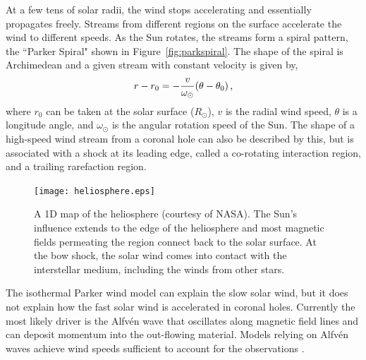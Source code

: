 
At a few tens of solar radii, the wind stops accelerating and essentially propagates freely. Streams from different regions on the surface accelerate the wind to different speeds. As the Sun rotates, the streams form a spiral pattern, the ``Parker Spiral" shown in Figure~\ref{fig:parkspiral}. The shape of the spiral is Archimedean and a given stream with constant velocity is given by,
\begin{equation}
r-r_0 =  - \frac{v}{\omega_{\odot}}(\theta-\theta_0) \mbox{\,,}
\end{equation}
where $r_0$ can be taken at the solar surface ($R_\odot$), $v$ is the radial wind speed, $\theta$ is a longitude angle, and $\omega_{\odot}$ is the angular rotation speed of the Sun. The shape of a high-speed wind stream from a coronal hole can also be described by this, but is associated with a shock at its leading edge, called a co-rotating interaction region, and a trailing rarefaction region.

\begin{figure}[!t]
\centerline{\texttt{[image: heliosphere.eps]}}
\caption[A 1D map of the heliosphere.]{A 1D map of the heliosphere (courtesy of NASA). The Sun's influence extends to the edge of the heliosphere and most magnetic fields permeating the region connect back to the solar surface. At the bow shock, the solar wind comes into contact with the interstellar medium, including the winds from other stars.}
\label{fig:heliosphere}
\end{figure}

The isothermal Parker wind model can explain the slow solar wind, but it does not explain how the fast solar wind is accelerated in coronal holes. Currently the most likely driver is the Alfv\'en wave that oscillates along magnetic field lines and can deposit momentum into the out-flowing material. Models relying on Alfv\'en waves achieve wind speeds sufficient to account for the observations \citep{Ofman:2010}. 

